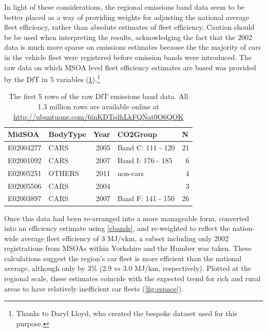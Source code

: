 In light of these considerations, the regional emissions band data seem to be
better placed as a way of providing weights for adjusting the
national average fleet efficiency, rather than absolute estimates of
fleet efficiency. Caution should be be used when interpreting the results,
acknowledging the fact that the 2002 data is much more sparse on
emissions estimates because the the majority of cars in the vehicle fleet
were registered before emission bands were introduced.
The raw
data on which MSOA level fleet efficiency estimates are based was provided by
the DfT in 5 variables (\cref{tefraw}).\footnote{Thanks to Daryl Lloyd,
who created the bespoke dataset
used for this purpose.
}

\begin{table}[htbp]
\caption[The first 5 rows of the raw DfT emissions band data]
{The first 5 rows of the raw DfT emissions band data. All 1.3 million
rows are available online at \href{http://ubuntuone.com/6inKDTsdhLkFQNat0O6QOK}
{http://ubuntuone.com/6inKDTsdhLkFQNat0O6QOK}}
\begin{center}
\begin{tabular}{llrlr}
\toprule
MidSOA & BodyType & \multicolumn{1}{l}{Year} & CO2Group & \multicolumn{1}{l}{N} \\
\midrule
E02004277 & CARS & 2005 & Band C: 111 - 120 & 21 \\
E02001092 & CARS & 2007 & Band I: 176 - 185 & 6 \\
E02005251 & OTHERS & 2011 & non-cars & 4 \\
E02005506 & CARS & 2004 &  & 3 \\
E02003897 & CARS & 2007 & Band F: 141 - 150 & 26 \\
\bottomrule
\end{tabular} \end{center}
\label{tefraw}
\end{table}

Once this data had been re-arranged into a more manageable form, converted into
an efficiency estimate using \cref{ebands}, and re-weighted to reflect the nation-wide
average fleet efficiency of 3 MJ/vkm,
a subset including only 2002 registrations from MSOAs within
Yorkshire and the Humber was taken. These calculations suggest the region's car fleet is more
efficient than the national average, although only by 3\% (2.9 vs 3.0 MJ/km, respectively).
Plotted at the regional scale, these estimates coincide with the expected trend for rich
and rural areas to have relatively inefficient car fleets (\cref{fig:espace}).

